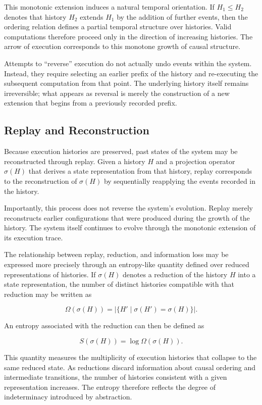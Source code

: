 \documentclass[12pt]{article}
\begin{document}
This monotonic extension induces a natural temporal
orientation. If $H_1 \leq H_2$ denotes that history
$H_2$ extends $H_1$ by the addition of further events,
then the ordering relation defines a partial temporal
structure over histories. Valid computations therefore
proceed only in the direction of increasing histories.
The arrow of execution corresponds to this monotone
growth of causal structure.

Attempts to ``reverse'' execution do not actually undo
events within the system. Instead, they require selecting
an earlier prefix of the history and re-executing the
subsequent computation from that point. The underlying
history itself remains irreversible; what appears as
reversal is merely the construction of a new extension
that begins from a previously recorded prefix.

\subsection{Replay and Reconstruction}

Because execution histories are preserved, past states
of the system may be reconstructed through replay.
Given a history $H$ and a projection operator
$\sigma(H)$ that derives a state representation
from that history, replay corresponds to the
reconstruction of $\sigma(H)$ by sequentially
reapplying the events recorded in the history.

Importantly, this process does not reverse the
system’s evolution. Replay merely reconstructs
earlier configurations that were produced during
the growth of the history. The system itself
continues to evolve through the monotonic extension
of its execution trace.

The relationship between replay, reduction, and
information loss may be expressed more precisely
through an entropy-like quantity defined over
reduced representations of histories. If
$\sigma(H)$ denotes a reduction of the history
$H$ into a state representation, the number of
distinct histories compatible with that reduction
may be written as

\[
\Omega(\sigma(H)) =
\left| \{ H' \mid \sigma(H') = \sigma(H) \} \right|.
\]

An entropy associated with the reduction can then
be defined as

\[
S(\sigma(H)) = \log \Omega(\sigma(H)).
\]

This quantity measures the multiplicity of execution
histories that collapse to the same reduced state.
As reductions discard information about causal
ordering and intermediate transitions, the number
of histories consistent with a given representation
increases. The entropy therefore reflects the
degree of indeterminacy introduced by abstraction.
\end{document}
